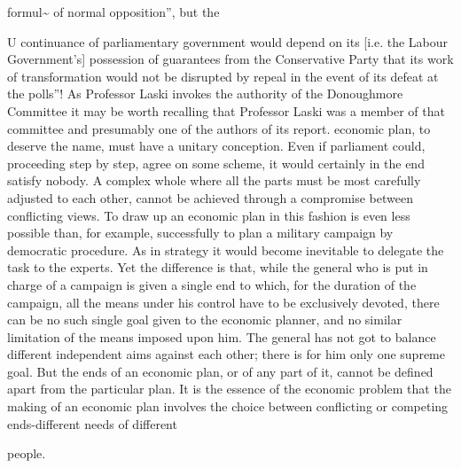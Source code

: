\documentclass[11pt,openany]{book}
\begin{document}
formul\textasciitilde{} of normal opposition'', but the

U continuance of parliamentary government would depend on its [i.e. the Labour Government's] possession of guarantees from the Conservative Party that its work of transformation would not be disrupted by repeal in the event of its defeat at the polls''! As Professor Laski invokes the authority of the Donoughmore Committee it may be worth recalling that Professor Laski was a member of that committee and presumably one of the authors of its report. economic plan, to deserve the name, must have a unitary conception. Even if parliament could, proceeding step by step, agree on some scheme, it would certainly in the end satisfy nobody. A complex whole where all the parts must be most carefully adjusted to each other, cannot be achieved through a compromise between conflicting views. To draw up an economic plan in this fashion is even less possible than, for example, successfully to plan a military campaign by democratic procedure. As in strategy it would become inevitable to delegate the task to the experts. Yet the difference is that, while the general who is put in charge of a campaign is given a single end to which, for the duration of the campaign, all the means under his control have to be exclusively devoted, there can be no such single goal given to the economic planner, and no similar limitation of the means imposed upon him. The general has not got to balance different independent aims against each other; there is for him only one supreme goal. But the ends of an economic plan, or of any part of it, cannot be defined apart from the particular plan. It is the essence of the economic problem that the making of an economic plan involves the choice between conflicting or competing ends-different needs of different

people.
\end{document}
